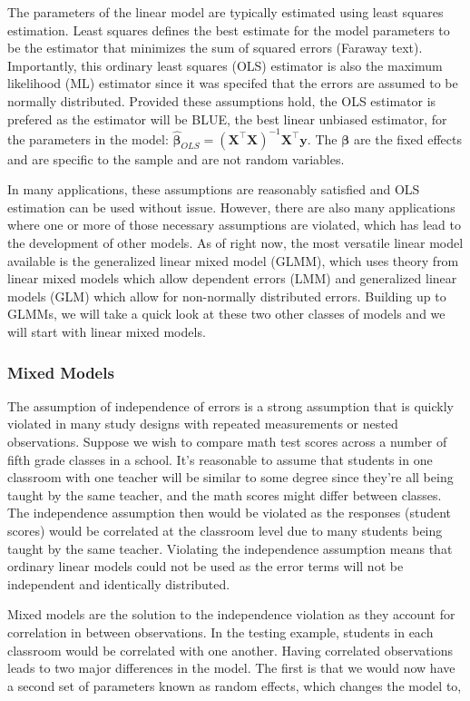 \documentclass{article}\usepackage[]{graphicx}\usepackage[]{color}
\newcommand{\T}{{\intercal}}
\newcommand{\mb}[1]{$\bm{#1}$}
\begin{document}
The parameters of the linear model are typically estimated using least squares estimation. Least squares defines the best estimate for the model parameters to be the estimator that minimizes the sum of squared errors (Faraway text). Importantly, this ordinary least squares (OLS) estimator is also the maximum likelihood (ML) estimator since it was specifed that the errors are assumed to be normally distributed. Provided these assumptions hold, the OLS estimator is prefered as the estimator will be BLUE, the best linear unbiased estimator, for the parameters in the model: $ \hat{\bm{\beta}}_{OLS} = (\bm{X}^{\T}\bm{X})^{-1}\bm{X}^{\T}\bm{y}$. The \mb{\beta} are the fixed effects and are specific to the sample and are not random variables. 

In many applications, these assumptions are reasonably satisfied and OLS estimation can be used without issue. However, there are also many applications where one or more of those necessary assumptions are violated, which has lead to the development of other models. As of right now, the most versatile linear model available is the generalized linear mixed model (GLMM), which uses theory from linear mixed models which allow dependent errors (LMM) and generalized linear models (GLM) which allow for non-normally distributed errors. Building up to GLMMs, we will take a quick look at these two other classes of models and we will start with linear mixed models. 

\subsubsection{Mixed Models}

The assumption of independence of errors is a strong assumption that is quickly violated in many study designs with repeated measurements or nested observations. Suppose we wish to compare math test scores across a number of fifth grade classes in a school. It's reasonable to assume that students in one classroom with one teacher will be similar to some degree since they're all being taught by the same teacher, and the math scores might differ between classes. The independence assumption then would be violated as the responses (student scores) would be correlated at the classroom level due to many students being taught by the same teacher. Violating the independence assumption means that ordinary linear models could not be used as the error terms will not be independent and identically distributed.

Mixed models are the solution to the independence violation as they account for correlation in between observations. In the testing example, students in each classroom would be correlated with one another. Having correlated observations leads to two major differences in the model. The first is that we would now have a second set of parameters known as random effects, which changes the model to,
\end{document}
